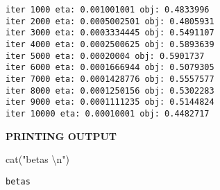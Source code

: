 \documentclass[
  letterpaper,
  DIV=11,
  numbers=noendperiod]{scrartcl}
\newenvironment{Shaded}{\begin{snugshade}}{\end{snugshade}}
\newcommand{\FunctionTok}[1]{\textcolor[rgb]{0.28,0.35,0.67}{#1}}
\newcommand{\NormalTok}[1]{\textcolor[rgb]{0.00,0.23,0.31}{#1}}
\newcommand{\SpecialCharTok}[1]{\textcolor[rgb]{0.37,0.37,0.37}{#1}}
\newcommand{\StringTok}[1]{\textcolor[rgb]{0.13,0.47,0.30}{#1}}
\begin{document}
\begin{verbatim}
iter 1000 eta: 0.001001001 obj: 0.4833996 
iter 2000 eta: 0.0005002501 obj: 0.4805931 
iter 3000 eta: 0.0003334445 obj: 0.5491107 
iter 4000 eta: 0.0002500625 obj: 0.5893639 
iter 5000 eta: 0.00020004 obj: 0.5901737 
iter 6000 eta: 0.0001666944 obj: 0.5079305 
iter 7000 eta: 0.0001428776 obj: 0.5557577 
iter 8000 eta: 0.0001250156 obj: 0.5302283 
iter 9000 eta: 0.0001111235 obj: 0.5144824 
iter 10000 eta: 0.00010001 obj: 0.4482717 
\end{verbatim}

\textbf{PRINTING OUTPUT}

\begin{Shaded}
\begin{Highlighting}[]
\FunctionTok{cat}\NormalTok{(}\StringTok{"betas }\SpecialCharTok{\textbackslash{}n}\StringTok{"}\NormalTok{)}
\end{Highlighting}
\end{Shaded}

\begin{verbatim}
betas 
\end{verbatim}

\begin{Shaded}
\end{Shaded}
\end{document}
